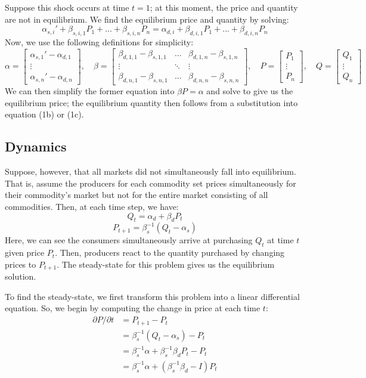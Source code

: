 \documentclass[12pt]{article}
\begin{document}
Suppose this shock occurs at time $t=1$; at this moment, the price and quantity are not in equilibrium. We find the equilibrium price and quantity by solving:
$$ \alpha_{s,i}' + \beta_{s,i,1} P_1 + ... + \beta_{s,i,n} P_n = \alpha_{d,i} + \beta_{d,i,1} P_1 + ... + \beta_{d,i,n} P_n$$
Now, we use the following definitions for simplicity:
$$ 
\alpha=\begin{bmatrix}
 	\alpha_{s,1}' - \alpha_{d,1} \\
 	\vdots\\
 	\alpha_{s,n}' - \alpha_{d,n}
\end{bmatrix} 
,\quad
\beta=\begin{bmatrix}
\beta_{d,1,1} - \beta_{s,1,1} & \dots & \beta_{d,1,n} - \beta_{s,1,n} \\
\vdots & \ddots & \vdots \\
\beta_{d,n,1} - \beta_{s,n,1} & \dots & \beta_{d,n,n} - \beta_{s,n,n}
\end{bmatrix} 
,\quad
P=\begin{bmatrix}
P_1 \\
\vdots\\
P_n
\end{bmatrix} 
,\quad
Q=\begin{bmatrix}
Q_1 \\
\vdots\\
Q_n
\end{bmatrix} 
$$
We can then simplify the former equation into $\beta P = \alpha$ and solve to give us the equilibrium price; the equilibrium quantity then follows from a substitution into equation (1b) or (1c). 

\subsection{Dynamics}

Suppose, however, that all markets did not simultaneously fall into equilibrium. That is, assume the producers for each commodity set prices simultaneously for their commodity's market but not for the entire market consisting of all commodities. Then, at each time step, we have:
$$Q_{t} = \alpha_d + \beta_d P_t$$
$$P_{t+1} = \beta_s^{-1} (Q_{t} - \alpha_s)$$
Here, we can see the consumers simultaneously arrive at purchasing $Q_t$ at time $t$ given price $P_t$. Then, producers react to the quantity purchased by changing prices to $P_{t+1}$. The steady-state for this problem gives us the equilibrium solution. 

To find the steady-state, we first transform this problem into a linear differential equation. So, we begin by computing the change in price at each time $t$:
\begin{align*}
{\partial P}/{\partial t} &= P_{t+1} - P_t 		     \\
&= \beta_s^{-1} (Q_{t} - \alpha_s) - P_t				 \\
&= \beta_s^{-1} \alpha  + \beta_s^{-1} \beta_d P_t - P_t \\
&= \beta_s^{-1} \alpha  + (\beta_s^{-1} \beta_d - I) P_t
\end{align*}
\end{document}

